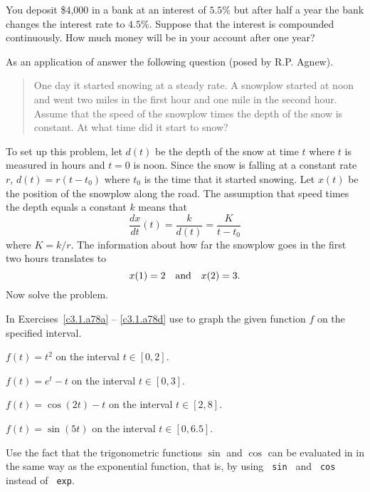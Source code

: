 \begin{exercise} \label{c3.1.7A}
You deposit \$4,000 in a bank at an interest of $5.5\%$ but after half 
a year the bank changes the interest rate to $4.5\%$.  Suppose that the 
interest is compounded continuously.  How much money will be in your 
account after one year?
\end{exercise}

\begin{exercise} \label{c3.1.7}
As an application of  answer the following question
(posed by R.P. Agnew).
\begin{quote}
One day it started snowing at a steady rate.  A snowplow started at
noon and went two miles in the first hour and one mile in the second
hour.  Assume that the speed of the snowplow times the depth of the
snow is constant.  At what time did it start to snow?
\end{quote}

\noindent To set up this problem, let $d(t)$ be the depth of the snow
at time $t$ where $t$ is measured in hours and $t=0$ is noon.
Since the snow is falling at a constant rate $r$, $d(t)= r(t-t_0)$
where $t_0$ is the time that it started snowing.  Let $x(t)$ be the
position of the snowplow along the road.  The assumption that speed
times the depth equals a constant $k$ means that
\[
\frac{dx}{dt}(t) = \frac{k}{d(t)} = \frac{K}{t-t_0}
\]
where $K=k/r$.  The information about how far the snowplow goes in the
first two hours translates to
\[
x(1) = 2  \quad\mbox{and}\quad x(2) =3.
\]
Now solve the problem.
\end{exercise}


\CEXER

\noindent In Exercises~\ref{c3.1.a78a} -- \ref{c3.1.a78d} use \Matlab
to graph the given function $f$ on the specified interval.
\begin{exercise} \label{c3.1.a78a}
$f(t) = t^2$ on the interval $t\in [0,2]$.
\end{exercise}
\begin{exercise} \label{c3.1.a78b}
$f(t) = e^t-t$ on the interval $t\in [0,3]$.
\end{exercise}
\begin{exercise} \label{c3.1.a78c}
$f(t) = \cos(2t)-t$ on the interval $t\in [2,8]$.
\end{exercise}
\begin{exercise} \label{c3.1.a78d}
$f(t) = \sin(5t)$ on the interval $t\in [0,6.5]$.
\end{exercise}

 Use the fact that the trigonometric functions $\sin$ and
$\cos$ can be evaluated in \Matlab in the same way as the exponential
function, that is, by using \verb+ sin +  and
\verb+ cos +  instead of \verb+ exp+.


